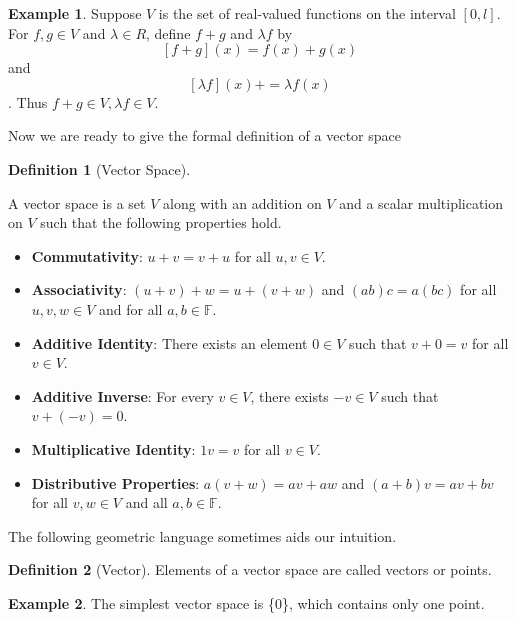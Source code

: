\documentclass[
]{book}
\providecommand{\tightlist}{%
  \setlength{\itemsep}{0pt}\setlength{\parskip}{0pt}}
\theoremstyle{definition}
\newtheorem{definition}{Definition}[chapter]
\theoremstyle{definition}
\newtheorem{example}{Example}[chapter]
\theoremstyle{definition}
\theoremstyle{definition}
\theoremstyle{remark}
\begin{document}
\begin{example}
\protect\hypertarget{exm:unnamed-chunk-20}{}\label{exm:unnamed-chunk-20}Suppose \(V\) is the set of real-valued functions on the interval \([0, l]\). For \(f,g \in V\) and \(\lambda \in R\), define \(f+ g\) and \(\lambda f\) by
\[[f+g](x) = f (x) + g(x)\]
and
\[[\lambda f](x) + = \lambda f (x) \].
Thus \(f+g \in V, \lambda f\in V\).
\end{example}

Now we are ready to give the formal definition of a vector space

\begin{definition}[Vector Space]
\protect\hypertarget{def:unnamed-chunk-21}{}\label{def:unnamed-chunk-21}

A vector space is a set \(V\) along with an addition on \(V\) and a scalar multiplication on \(V\) such that the following properties hold.

\begin{itemize}
\tightlist
\item
  \textbf{Commutativity}: \(u + v = v + u\) for all \(u, v \in V\).
\item
  \textbf{Associativity}: \((u + v) + w = u + (v + w)\) and \((ab)c = a(bc)\) for all \(u, v, w \in V\) and for all \(a, b \in \mathbb{F}\).
\item
  \textbf{Additive Identity}: There exists an element \(0 \in V\) such that \(v + 0 = v\) for all \(v \in V\).
\item
  \textbf{Additive Inverse}: For every \(v \in V\), there exists \(-v \in V\) such that \(v + (-v) = 0\).
\item
  \textbf{Multiplicative Identity}: \(1v = v\) for all \(v \in V\).
\item
  \textbf{Distributive Properties}: \(a(v + w) = av + aw\) and \((a + b)v = av + bv\) for all \(v, w \in V\) and all \(a, b \in \mathbb{F}\).
\end{itemize}

\end{definition}

The following geometric language sometimes aids our intuition.

\begin{definition}[Vector]
\protect\hypertarget{def:unnamed-chunk-22}{}\label{def:unnamed-chunk-22}Elements of a vector space are called vectors or points.
\end{definition}

\begin{example}
\protect\hypertarget{exm:unnamed-chunk-23}{}\label{exm:unnamed-chunk-23}The simplest vector space is \{0\}, which contains only one point.
\end{example}
\end{document}
